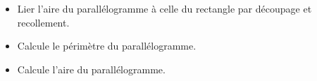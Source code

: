 \begin{prerequis}    
    \begin{itemize}        
        \item[\emoji{red-heart}] Lier l'aire du parallélogramme à celle du rectangle par découpage et recollement.
        \item[\emoji{diamond-suit}] Calcule le périmètre du parallélogramme.
        \item[\emoji{diamond-suit}] Calcule l’aire du parallélogramme.
    \end{itemize}
\end{prerequis}